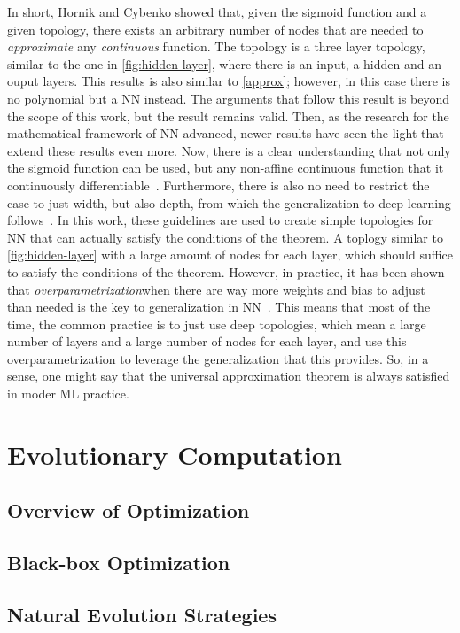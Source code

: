 In short, Hornik and Cybenko showed that, given the sigmoid function and a given topology, 
there exists an arbitrary number of nodes that are needed to \emph{approximate} any 
\emph{continuous} function. The topology is a three layer topology, similar to the one in 
\autoref{fig:hidden-layer}, where there is an input, a hidden and an ouput layers. This 
results is also similar to \autoref{approx}; however, in this case there is no polynomial 
but a NN instead. The arguments that follow this result is beyond the scope of this work, 
but the result remains valid. Then, as the research for the mathematical framework of NN 
advanced, newer results have seen the light that extend these results even more. Now, there 
is a clear understanding that not only the sigmoid function can be used, but any non-affine 
continuous function that it continuously differentiable~\cite{parkMinimumWidthUniversal2020}. Furthermore, there is also no need to restrict the case to just width, but also depth, 
from which the generalization to deep learning 
follows~\cite{zhouUniversalityDeepConvolutional2020,bernerModernMathematicsDeep2021}.
In this work, these guidelines are used to create simple topologies for NN that can 
actually satisfy the conditions of the theorem. A toplogy similar to 
\autoref{fig:hidden-layer} with a large amount of nodes for each layer, which should 
suffice to satisfy the conditions of the theorem. However, in practice, it has been shown 
that \emph{overparametrization}\textemdash when there are way more weights and bias to adjust than needed \textemdash is the key to generalization in 
NN~\cite{neyshaburRoleOverparametrizationGeneralization2018,cohenLearningCurvesOverparametrized2021}.
This means that most of the time, the common practice is to just use deep topologies, which 
mean a large number of layers and a large number of nodes for each layer, and use this 
overparametrization to leverage the generalization that this provides. So, in a sense, one 
might say that the universal approximation theorem is always satisfied in moder ML practice.

\section{Evolutionary Computation}
\subsection{Overview of Optimization}
\subsection{Black-box Optimization}
\subsection{Natural Evolution Strategies}